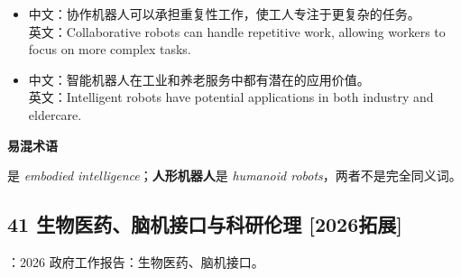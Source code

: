 \documentclass[a4paper,11pt,UTF8,fontset=none]{ctexart}
\begin{document}
\par

\begin{itemize}[leftmargin=1.7em,itemsep=1pt,parsep=0pt,topsep=2pt]
\item \noindent 中文：协作机器人可以承担重复性工作，使工人专注于更复杂的任务。\\ 英文：Collaborative robots can handle repetitive work, allowing workers to focus on more complex tasks.\par


\item \noindent 中文：智能机器人在工业和养老服务中都有潜在的应用价值。\\ 英文：Intelligent robots have potential applications in both industry and eldercare.\par


\end{itemize}

\begin{tcolorbox}[enhanced,breakable,boxrule=0.35pt,colback=VeryPaleRose,colframe=WarmRed!40,left=7pt,right=7pt,top=4pt,bottom=4pt,borderline west={2pt}{0pt}{WarmRed},before skip=4pt,after skip=6pt]
{\bfseries\color{WarmRed} 易混术语}\par\vspace{1pt}
是 {\itshape embodied intelligence}；{\bfseries 人形机器人}是 {\itshape humanoid robots}，两者不是完全同义词。\par


\end{tcolorbox}

\subsection{41 生物医药、脑机接口与科研伦理 {\color{AccentBlue} [2026拓展]}}

\begin{tcolorbox}[enhanced,breakable,boxrule=0.35pt,colback=VeryPaleBlue,colframe=AccentBlue!40,left=7pt,right=7pt,top=4pt,bottom=4pt,borderline west={2pt}{0pt}{AccentBlue},before skip=4pt,after skip=6pt]
：2026 政府工作报告：生物医药、脑机接口。\par


\end{tcolorbox}
\end{document}
